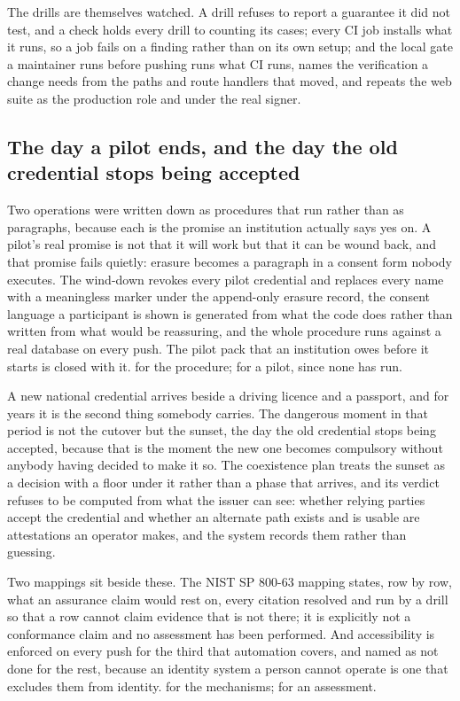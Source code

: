 The drills are themselves watched. A drill refuses to report a guarantee it did not test, and a check
holds every drill to counting its cases; every CI job installs what it runs, so a job fails on a
finding rather than on its own setup; and the local gate a maintainer runs before pushing runs what
CI runs, names the verification a change needs from the paths and route handlers that moved, and
repeats the web suite as the production role and under the real signer. \sImpl

\subsection{The day a pilot ends, and the day the old credential stops being accepted}

Two operations were written down as procedures that run rather than as paragraphs, because each is
the promise an institution actually says yes on. A pilot's real promise is not that it will work but
that it can be wound back, and that promise fails quietly: erasure becomes a paragraph in a consent
form nobody executes. The wind-down revokes every pilot credential and replaces every
name with a meaningless marker under the append-only erasure record, the consent language a
participant is shown is generated from what the code does rather than written from what would be
reassuring, and the whole procedure runs against a real database on every push. The pilot pack that
an institution owes before it starts is closed with it. \sImplMark{} for the procedure; \sExt{} for a
pilot, since none has run.

A new national credential arrives beside a driving licence and a passport, and for years it is the
second thing somebody carries. The dangerous moment in that period is not the cutover but the
sunset, the day the old credential stops being accepted, because that is the moment the new one
becomes compulsory without anybody having decided to make it so. The coexistence plan
treats the sunset as a decision with a floor under it rather than a phase that arrives, and its
verdict refuses to be computed from what the issuer can see: whether relying parties accept the
credential and whether an alternate path exists and is usable are attestations an operator makes,
and the system records them rather than guessing. \sImpl

Two mappings sit beside these. The NIST SP 800-63 mapping states, row by row, what an assurance
claim would rest on, every citation resolved and run by a drill so that a row cannot claim evidence
that is not there; it is explicitly not a conformance claim and no assessment has been performed.
And accessibility is enforced on every push for the third that automation covers, and named as not
done for the rest, because an identity system a person cannot operate is one that excludes them from
identity. \sImplMark{} for the mechanisms; \sExt{} for an assessment.

